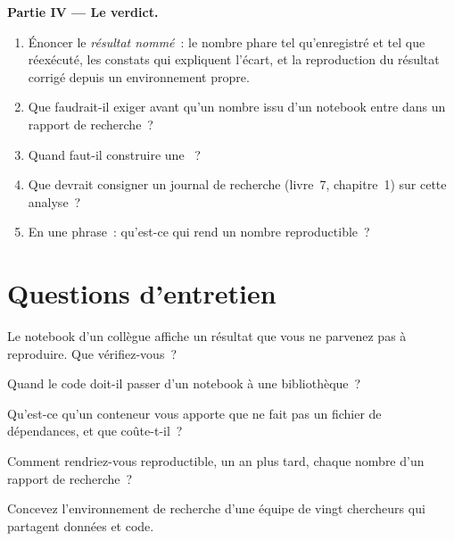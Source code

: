 \begin{problem}
\medskip\noindent\textbf{Partie IV --- Le verdict.}
\begin{enumerate}[resume]
\item Énoncer le \emph{résultat nommé}~: le nombre phare tel qu'enregistré et tel que réexécuté, les constats qui expliquent l'écart, et la reproduction
du résultat corrigé depuis un environnement propre.
\item Que faudrait-il exiger avant qu'un nombre issu d'un notebook entre dans un rapport de recherche~?
\item Quand faut-il construire une ~?
\item Que devrait consigner un journal de recherche (livre~7, chapitre~1) sur cette analyse~?
\item En une phrase~: qu'est-ce qui rend un nombre reproductible~?
\end{enumerate}
\end{problem}

\section{Questions d'entretien}

\begin{interviewq}\label{iq:pl:the-research-environment:1}
Le notebook d'un collègue affiche un résultat que vous ne parvenez pas à reproduire. Que vérifiez-vous~?
\end{interviewq}

\begin{interviewq}\label{iq:pl:the-research-environment:2}
Quand le code doit-il passer d'un notebook à une bibliothèque~?
\end{interviewq}

\begin{interviewq}\label{iq:pl:the-research-environment:3}
Qu'est-ce qu'un conteneur vous apporte que ne fait pas un fichier de dépendances, et que coûte-t-il~?
\end{interviewq}

\begin{interviewq}\label{iq:pl:the-research-environment:4}
Comment rendriez-vous reproductible, un an plus tard, chaque nombre d'un rapport de recherche~?
\end{interviewq}

\begin{interviewq}\label{iq:pl:the-research-environment:5}
Concevez l'environnement de recherche d'une équipe de vingt chercheurs qui partagent données et code.
\end{interviewq}
